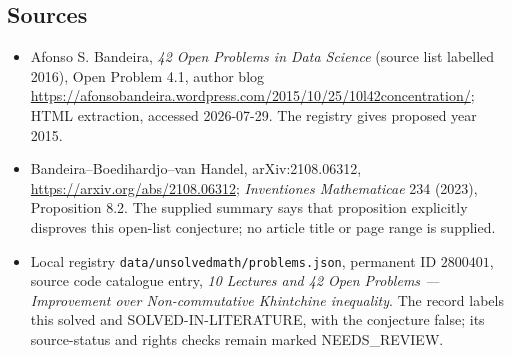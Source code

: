 \documentclass[11pt]{article}
\begin{document}
\subsection{Sources}
\begin{itemize}
\item Afonso S. Bandeira, \emph{42 Open Problems in Data Science} (source list labelled 2016), Open Problem 4.1, author blog \url{https://afonsobandeira.wordpress.com/2015/10/25/10l42concentration/}; HTML extraction, accessed 2026-07-29. The registry gives proposed year 2015.
\item Bandeira--Boedihardjo--van Handel, arXiv:2108.06312, \url{https://arxiv.org/abs/2108.06312}; \emph{Inventiones Mathematicae} 234 (2023), Proposition 8.2. The supplied summary says that proposition explicitly disproves this open-list conjecture; no article title or page range is supplied.
\item Local registry \texttt{data/unsolvedmath/problems.json}, permanent ID $2800401$, source code catalogue entry, \emph{10 Lectures and 42 Open Problems --- Improvement over Non-commutative Khintchine inequality}. The record labels this solved and SOLVED-IN-LITERATURE, with the conjecture false; its source-status and rights checks remain marked NEEDS\_REVIEW.
\end{itemize}
\end{document}
